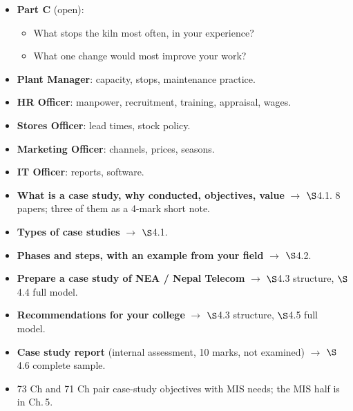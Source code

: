 {\begin{itemize}
\begin{itemize}
      \item training and growth; recognition.
    \end{itemize}
  \item \textbf{Part C} (open):
    \begin{itemize}
      \item What stops the kiln most often, in your experience?
      \item What one change would most improve your work?
    \end{itemize}
\end{itemize}
\begin{itemize}
  \item \textbf{Plant Manager}: capacity, stops, maintenance practice.
  \item \textbf{HR Officer}: manpower, recruitment, training, appraisal, wages.
  \item \textbf{Stores Officer}: lead times, stock policy.
  \item \textbf{Marketing Officer}: channels, prices, seasons.
  \item \textbf{IT Officer}: reports, software.
\end{itemize}}

\vspace{2pt}


\begin{itemize}
  \item \textbf{What is a case study, why conducted, objectives, value} $\rightarrow$
    $\S$4.1. 8 papers; three of them as a 4-mark short note.
  \item \textbf{Types of case studies}  $\rightarrow$ $\S$4.1.
  \item \textbf{Phases and steps, with an example from your field} $\rightarrow$ $\S$4.2.
  \item \textbf{Prepare a case study of NEA / Nepal Telecom} 
    $\rightarrow$ $\S$4.3 structure, $\S$4.4 full model.
  \item \textbf{Recommendations for your college}  $\rightarrow$
    $\S$4.3 structure, $\S$4.5 full model.
  \item \textbf{Case study report} (internal assessment, 10 marks, not examined)
    $\rightarrow$ $\S$4.6 complete sample.
  \item 73 Ch and 71 Ch pair case-study objectives with MIS needs; the MIS half is in Ch.\,5.
\end{itemize}

